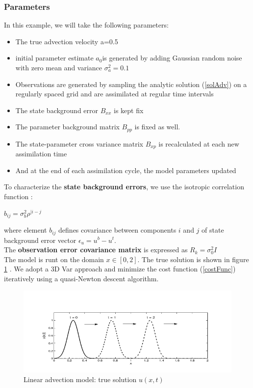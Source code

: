 \documentclass[a4,12pt]{article}
\numberwithin{equation}{section}
\begin{document}
\subsubsection{Parameters}
In this example, we will take the following parameters:
\begin{itemize}
\item The true advection velocity a=0.5
\item initial parameter estimate $a_0 $is generated by adding Gaussian random noise with zero mean and variance $\sigma_a^2 = 0.1$
\item Observations are generated by sampling the analytic solution (\ref{solAdv}) on a regularly spaced grid and are assimilated at regular time intervals
\item The state background error $B_{xx}$ is kept fix
\item The parameter background matrix $B_{pp}$ is fixed as well.
\item The state-parameter cross variance matrix $B_{xp}$ is recalculated at each new assimilation time
\item And at the end of each assimilation cycle, the model parameters updated
\end{itemize}
To characterize the \textbf{state background errors}, we use the isotropic correlation function :
\begin{center}
    $b_{ij} = \sigma_b^2 \rho ^{|i-j} $
\end{center}
where element $b_{ij}$ defines covariance between components $i$ and $j$ of state background error vector $\epsilon_u = u^b - u^t$. \\
The \textbf{observation error covariance matrix} is expressed as 
$R_k = \sigma_0^2 I$ \\
The model is runt on the domain $x \in [0,2]$.
The true solution is shown in figure \ref{trueSol} \cite{HybridSequential}.
We adopt a 3D Var approach and minimize the cost function (\ref{costFunc}) iteratively using a quasi-Newton descent algorithm.

\begin{figure}[h]
    \begin{center}
    \includegraphics[width=15cm]{../Image/trueSolAdvection.png}
    \caption{Linear advection model: true solution $u(x, t)$}
    \label{trueSol}
    \end{center}
\end{figure}
\end{document}
